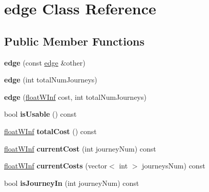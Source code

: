 \hypertarget{classedge}{
\section{edge Class Reference}
\label{classedge}
}
\subsection*{Public Member Functions}
\begin{DoxyCompactItemize}
\item 
\hypertarget{classedge_a58698861084d23879f15e1fd4c8a80b0}{
{\bfseries edge} (const \hyperlink{classedge}{edge} \&other)}
\label{classedge_a58698861084d23879f15e1fd4c8a80b0}

\item 
\hypertarget{classedge_a6bd56a76ce47c89affe580a3923dec45}{
{\bfseries edge} (int totalNumJourneys)}
\label{classedge_a6bd56a76ce47c89affe580a3923dec45}

\item 
\hypertarget{classedge_a430a55ca9481952b3c092baf2a6653cc}{
{\bfseries edge} (\hyperlink{classfloatWInf}{floatWInf} cost, int totalNumJourneys)}
\label{classedge_a430a55ca9481952b3c092baf2a6653cc}

\item 
\hypertarget{classedge_a634b1f866a4d7f74fd915efc01b5773c}{
bool {\bfseries isUsable} () const }
\label{classedge_a634b1f866a4d7f74fd915efc01b5773c}

\item 
\hypertarget{classedge_a7487344ae0251f0ee481f3bc0ba99f88}{
\hyperlink{classfloatWInf}{floatWInf} {\bfseries totalCost} () const }
\label{classedge_a7487344ae0251f0ee481f3bc0ba99f88}

\item 
\hypertarget{classedge_ad06ca321364bf220e7841528e854e694}{
\hyperlink{classfloatWInf}{floatWInf} {\bfseries currentCost} (int journeyNum) const }
\label{classedge_ad06ca321364bf220e7841528e854e694}

\item 
\hypertarget{classedge_a49e8a5fd5e39457865e2f32e402fa7da}{
\hyperlink{classfloatWInf}{floatWInf} {\bfseries currentCosts} (vector$<$ int $>$ journeysNum) const }
\label{classedge_a49e8a5fd5e39457865e2f32e402fa7da}

\item 
\hypertarget{classedge_a1b78265fe46e04caea902515dc738a11}{
bool {\bfseries isJourneyIn} (int journeyNum) const }
\label{classedge_a1b78265fe46e04caea902515dc738a11}


\end{DoxyCompactItemize}
